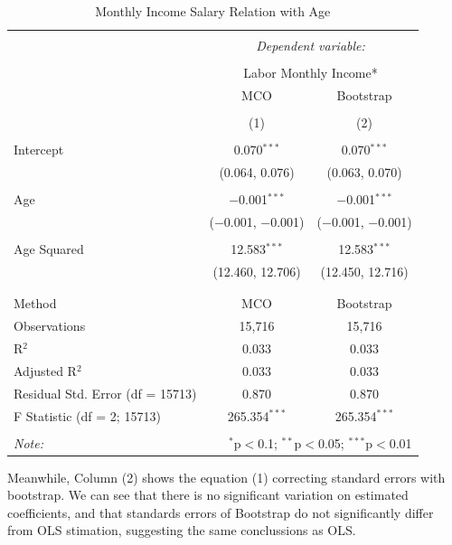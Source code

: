 \documentclass[a4paper,12pt]{article}
\begin{document}
\begin{table}[!htbp] \centering 
  \caption{Monthly Income Salary Relation with Age} 
  \label{tab:AGE} 
\begin{tabular}{@{\extracolsep{5pt}}lcc} 
\\[-1.8ex]\hline 
\hline \\[-1.8ex] 
 & \multicolumn{2}{c}{\textit{Dependent variable:}} \\ 
\cline{2-3} 
\\[-1.8ex] & \multicolumn{2}{c}{Labor Monthly Income*} \\ 
 & MCO & Bootstrap \\ 
\\[-1.8ex] & (1) & (2)\\ 
\hline \\[-1.8ex] 
 Intercept & 0.070$^{***}$ & 0.070$^{***}$ \\ 
  & (0.064, 0.076) & (0.063, 0.070) \\ 
  & & \\ 
 Age & $-$0.001$^{***}$ & $-$0.001$^{***}$ \\ 
  & ($-$0.001, $-$0.001) & ($-$0.001, $-$0.001) \\ 
  & & \\ 
 Age Squared & 12.583$^{***}$ & 12.583$^{***}$ \\ 
  & (12.460, 12.706) & (12.450, 12.716) \\ 
  & & \\ 
\hline \\[-1.8ex] 
Method & MCO & Bootstrap \\ 
Observations & 15,716 & 15,716 \\ 
R$^{2}$ & 0.033 & 0.033 \\ 
Adjusted R$^{2}$ & 0.033 & 0.033 \\ 
Residual Std. Error (df = 15713) & 0.870 & 0.870 \\ 
F Statistic (df = 2; 15713) & 265.354$^{***}$ & 265.354$^{***}$ \\ 
\hline 
\hline \\[-1.8ex] 
\textit{Note:}  & \multicolumn{2}{r}{$^{*}$p$<$0.1; $^{**}$p$<$0.05; $^{***}$p$<$0.01} \\ 
\end{tabular} 
\end{table} 

Meanwhile, Column (2) shows the equation (1) correcting standard errors with bootstrap. We can see that there is no significant variation on estimated coefficients, and that standards errors of Bootstrap do not significantly differ from OLS stimation, suggesting the same conclussions as OLS.
\end{document}
